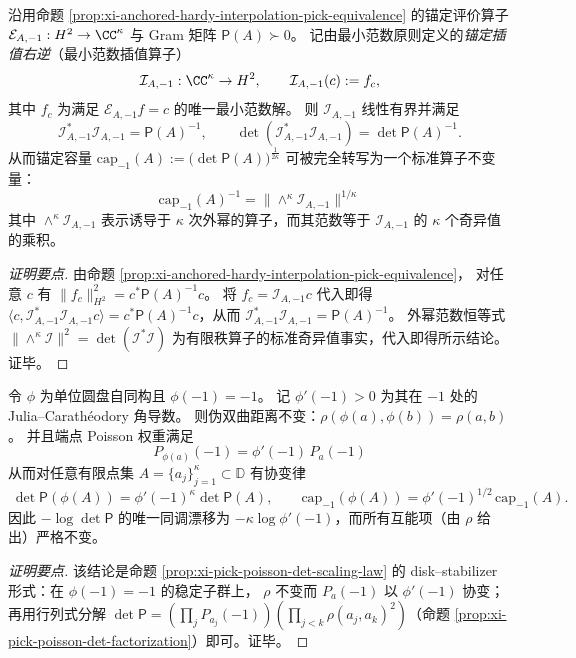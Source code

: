 \begin{proposition}\label{prop:xi-anchored-capacity-exterior-power-interpolant}
沿用命题 \ref{prop:xi-anchored-hardy-interpolation-pick-equivalence} 的锚定评价算子
\(\mathcal{E}_{A,-1}:H^2\to\CC^{\kappa}\) 与 Gram 矩阵 \(\mathsf P(A)\succ0\)。
记由最小范数原则定义的\emph{锚定插值右逆}（最小范数插值算子）
\[
\mathcal{I}_{A,-1}:\CC^{\kappa}\to H^2,\qquad \mathcal{I}_{A,-1}(c):=f_c,
\]
其中 \(f_c\) 为满足 \(\mathcal{E}_{A,-1}f=c\) 的唯一最小范数解。
则 \(\mathcal{I}_{A,-1}\) 线性有界并满足
\[
\boxed{\;
\mathcal{I}_{A,-1}^{\ast}\mathcal{I}_{A,-1}=\mathsf P(A)^{-1},
\qquad
\det(\mathcal{I}_{A,-1}^{\ast}\mathcal{I}_{A,-1})=\det\mathsf P(A)^{-1}.\;}
\]
从而锚定容量
\(\mathrm{cap}_{-1}(A):=\bigl(\det\mathsf P(A)\bigr)^{\frac{1}{2\kappa}}\)
可被完全转写为一个标准算子不变量：
\[
\boxed{\;
\mathrm{cap}_{-1}(A)^{-1}
=\bigl\|\wedge^{\kappa}\mathcal{I}_{A,-1}\bigr\|^{1/\kappa}\;}
\]
其中 \(\wedge^{\kappa}\mathcal{I}_{A,-1}\) 表示诱导于 \(\kappa\) 次外幂的算子，而其范数等于 \(\mathcal{I}_{A,-1}\) 的 \(\kappa\) 个奇异值的乘积。
\end{proposition}
\begin{proof}[证明要点]
由命题 \ref{prop:xi-anchored-hardy-interpolation-pick-equivalence}，
对任意 \(c\) 有 \(\|f_c\|_{H^2}^2=c^\ast\mathsf P(A)^{-1}c\)。
将 \(f_c=\mathcal{I}_{A,-1}c\) 代入即得
\(\langle c,\mathcal{I}_{A,-1}^{\ast}\mathcal{I}_{A,-1}c\rangle
=c^\ast\mathsf P(A)^{-1}c\)，从而 \(\mathcal{I}_{A,-1}^{\ast}\mathcal{I}_{A,-1}=\mathsf P(A)^{-1}\)。
外幂范数恒等式 \(\|\wedge^{\kappa}\mathcal{I}\|^2=\det(\mathcal{I}^{\ast}\mathcal{I})\) 为有限秩算子的标准奇异值事实，代入即得所示结论。证毕。
\end{proof}

\begin{corollary}\label{cor:xi-anchored-capacity-stabilizer-covariance}
令 \(\phi\) 为单位圆盘自同构且 \(\phi(-1)=-1\)。
记 \(\phi'(-1)>0\) 为其在 \(-1\) 处的 Julia--Carath\'eodory 角导数。
则伪双曲距离不变：\(\rho(\phi(a),\phi(b))=\rho(a,b)\)。
并且端点 Poisson 权重满足
\[
\boxed{\;P_{\phi(a)}(-1)=\phi'(-1)\,P_a(-1)\;}
\]
从而对任意有限点集 \(A=\{a_j\}_{j=1}^{\kappa}\subset\mathbb{D}\) 有协变律
\[
\boxed{\;
\det\mathsf P(\phi(A))=\phi'(-1)^{\kappa}\det\mathsf P(A),\qquad
\mathrm{cap}_{-1}(\phi(A))=\phi'(-1)^{1/2}\,\mathrm{cap}_{-1}(A).\;}
\]
因此 \(-\log\det\mathsf P\) 的唯一同调漂移为 \(-\kappa\log\phi'(-1)\)，而所有互能项（由 \(\rho\) 给出）严格不变。
\end{corollary}
\begin{proof}[证明要点]
该结论是命题 \ref{prop:xi-pick-poisson-det-scaling-law} 的 disk--stabilizer 形式：在 \(\phi(-1)=-1\) 的稳定子群上，
\(\rho\) 不变而 \(P_a(-1)\) 以 \(\phi'(-1)\) 协变；再用行列式分解
\(\det\mathsf P=(\prod_j P_{a_j}(-1))(\prod_{j<k}\rho(a_j,a_k)^2)\)（命题 \ref{prop:xi-pick-poisson-det-factorization}）即可。证毕。
\end{proof}


